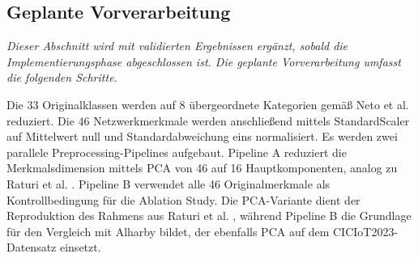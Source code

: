 \subsection{Geplante Vorverarbeitung}

\textit{Dieser Abschnitt wird mit validierten Ergebnissen ergänzt, sobald die Implementierungsphase abgeschlossen ist. Die geplante Vorverarbeitung umfasst die folgenden Schritte.}

Die 33 Originalklassen werden auf 8 übergeordnete Kategorien gemäß Neto et al. \cite{neto2023ciciot2023} reduziert. Die 46 Netzwerkmerkmale werden anschließend mittels StandardScaler auf Mittelwert null und Standardabweichung eins normalisiert. Es werden zwei parallele Preprocessing-Pipelines aufgebaut. Pipeline A reduziert die Merkmalsdimension mittels PCA von 46 auf 16 Hauptkomponenten, analog zu Raturi et al. \cite{raturi2026exploratory}. Pipeline B verwendet alle 46 Originalmerkmale als Kontrollbedingung für die Ablation Study. Die PCA-Variante dient der Reproduktion des Rahmens aus Raturi et al. \cite{raturi2026exploratory}, während Pipeline B die Grundlage für den Vergleich mit Alharby \cite{alharby2025ciciot} bildet, der ebenfalls PCA auf dem CICIoT2023-Datensatz einsetzt.
